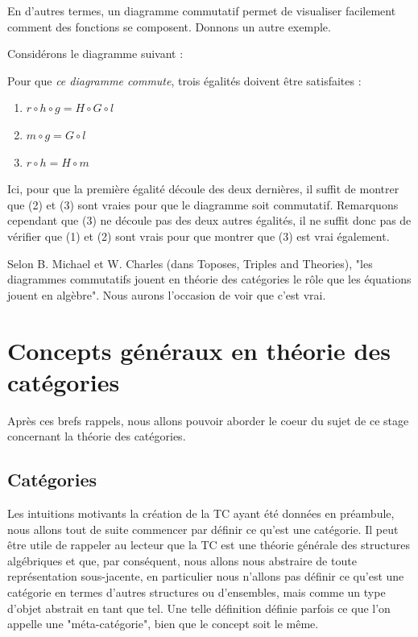 \documentclass{article}
\begin{document}
\noindent
En d'autres termes, un diagramme commutatif permet de visualiser facilement comment des fonctions se composent. Donnons un autre exemple.

\begin{example}[]{}
    Considérons le diagramme suivant :
    \begin{center}
    \end{center}
    Pour que \textit{ce diagramme commute}, trois égalités doivent être satisfaites :
    \begin{enumerate}
        \item $r\circ h\circ g = H\circ G\circ l$
        \item $m\circ g=G\circ l$
        \item $r\circ h=H\circ m$
\end{enumerate}

\noindent
Ici, pour que la première égalité découle des deux dernières, il suffit de montrer que (2) et (3) sont vraies pour que le diagramme soit commutatif. Remarquons cependant que (3) ne découle pas des deux autres égalités, il ne suffit donc pas de vérifier que (1) et (2) sont vrais pour que montrer que (3) est vrai également.
\end{example}

Selon B. Michael et W. Charles (dans Toposes, Triples and Theories), "les diagrammes commutatifs jouent en théorie des catégories le rôle que les équations jouent en algèbre". Nous aurons l'occasion de voir que c'est vrai.

\newpage
\section{Concepts généraux en théorie des catégories}
Après ces brefs rappels, nous allons pouvoir aborder le coeur du sujet de ce stage concernant la théorie des catégories. 

\subsection{Catégories}
Les intuitions motivants la création de la TC ayant été données en préambule, nous allons tout de suite commencer par définir ce qu'est une catégorie. Il peut être utile de rappeler au lecteur que la TC est une théorie générale des structures algébriques et que, par conséquent, nous allons nous abstraire de toute représentation sous-jacente, en particulier nous n'allons pas définir ce qu'est une catégorie en termes d'autres structures ou d'ensembles, mais comme un type d'objet abstrait en tant que tel. Une telle définition définie parfois ce que l'on appelle une "méta-catégorie", bien que le concept soit le même.
\end{document}
